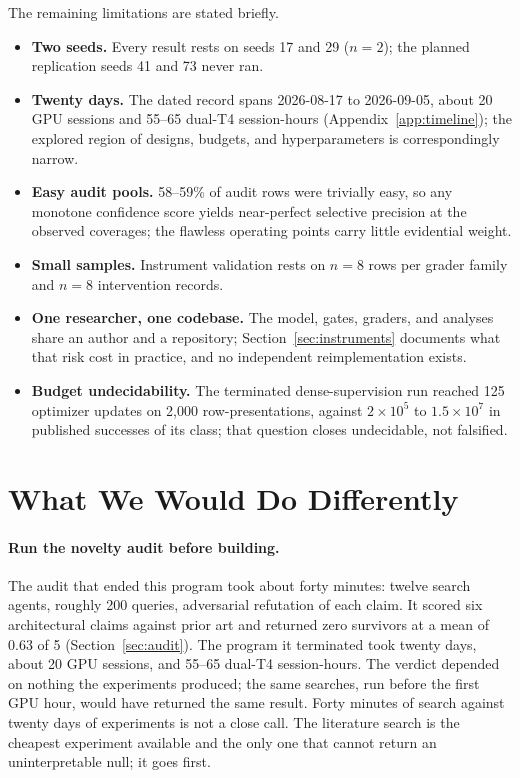 \documentclass[10pt,a4paper]{article}
\begin{document}
The remaining limitations are stated briefly.
\begin{itemize}
  \item \textbf{Two seeds.} Every result rests on seeds 17 and 29 ($n{=}2$); the planned replication seeds 41 and 73 never ran.
  \item \textbf{Twenty days.} The dated record spans 2026-08-17 to 2026-09-05, about 20 GPU sessions and 55--65 dual-T4 session-hours (Appendix~\ref{app:timeline}); the explored region of designs, budgets, and hyperparameters is correspondingly narrow.
  \item \textbf{Easy audit pools.} 58--59\% of audit rows were trivially easy, so any monotone confidence score yields near-perfect selective precision at the observed coverages; the flawless operating points carry little evidential weight.
  \item \textbf{Small samples.} Instrument validation rests on $n{=}8$ rows per grader family and $n{=}8$ intervention records.
  \item \textbf{One researcher, one codebase.} The model, gates, graders, and analyses share an author and a repository; Section~\ref{sec:instruments} documents what that risk cost in practice, and no independent reimplementation exists.
  \item \textbf{Budget undecidability.} The terminated dense-supervision run reached 125 optimizer updates on 2,000 row-presentations, against $2\times10^{5}$ to $1.5\times10^{7}$ in published successes of its class; that question closes undecidable, not falsified.
\end{itemize}

\section{What We Would Do Differently}\label{sec:lessons}

\paragraph{Run the novelty audit before building.}
The audit that ended this program took about forty minutes: twelve search agents, roughly 200 queries, adversarial refutation of each claim. It scored six architectural claims against prior art and returned zero survivors at a mean of 0.63 of 5 (Section~\ref{sec:audit}). The program it terminated took twenty days, about 20 GPU sessions, and 55--65 dual-T4 session-hours. The verdict depended on nothing the experiments produced; the same searches, run before the first GPU hour, would have returned the same result. Forty minutes of search against twenty days of experiments is not a close call. The literature search is the cheapest experiment available and the only one that cannot return an uninterpretable null; it goes first.
\end{document}
